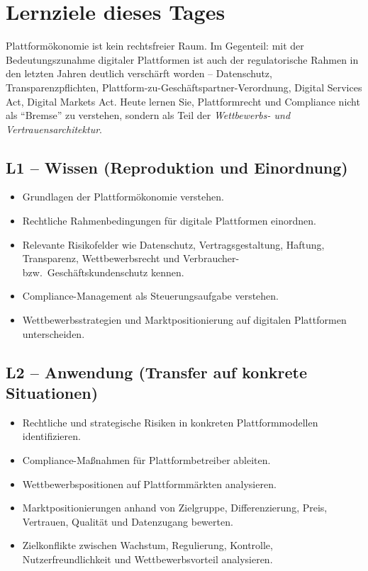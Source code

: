 \documentclass[11pt,a4paper,oneside]{article}
\begin{document}
\section*{Lernziele dieses Tages}
\thispagestyle{plain}

\noindent Plattformökonomie ist kein rechtsfreier Raum. Im Gegenteil: mit der Bedeutungszunahme digitaler Plattformen ist auch der regulatorische Rahmen in den letzten Jahren deutlich verschärft worden -- Datenschutz, Transparenzpflichten, Plattform-zu-Geschäftspartner-Verordnung, Digital Services Act, Digital Markets Act. Heute lernen Sie, Plattformrecht und Compliance nicht als ``Bremse'' zu verstehen, sondern als Teil der \emph{Wettbewerbs- und Vertrauensarchitektur}.

\subsection*{L1 -- Wissen (Reproduktion und Einordnung)}
\begin{itemize}
  \item Grundlagen der Plattformökonomie verstehen.
  \item Rechtliche Rahmenbedingungen für digitale Plattformen einordnen.
  \item Relevante Risikofelder wie Datenschutz, Vertragsgestaltung, Haftung, Transparenz, Wettbewerbsrecht und Verbraucher- bzw.\ Geschäftskundenschutz kennen.
  \item Compliance-Management als Steuerungsaufgabe verstehen.
  \item Wettbewerbsstrategien und Marktpositionierung auf digitalen Plattformen unterscheiden.
\end{itemize}

\subsection*{L2 -- Anwendung (Transfer auf konkrete Situationen)}
\begin{itemize}
  \item Rechtliche und strategische Risiken in konkreten Plattformmodellen identifizieren.
  \item Compliance-Maßnahmen für Plattformbetreiber ableiten.
  \item Wettbewerbspositionen auf Plattformmärkten analysieren.
  \item Marktpositionierungen anhand von Zielgruppe, Differenzierung, Preis, Vertrauen, Qualität und Datenzugang bewerten.
  \item Zielkonflikte zwischen Wachstum, Regulierung, Kontrolle, Nutzerfreundlichkeit und Wettbewerbsvorteil analysieren.
\end{itemize}
\end{document}
